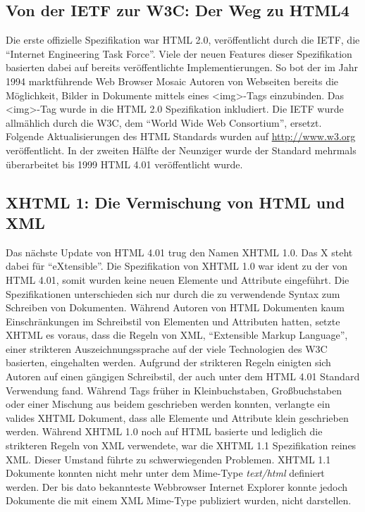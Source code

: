 \subsection{Von der IETF zur W3C: Der Weg zu HTML4}
Die erste offizielle Spezifikation war HTML 2.0, veröffentlicht durch die IETF,
die ``Internet Engineering Task Force''. Viele der neuen Features dieser
Spezifikation basierten dabei auf bereits veröffentlichte Implementierungen.
So bot der im Jahr 1994 marktführende Web Browser Mosaic Autoren von
Webseiten bereits die Möglichkeit, Bilder in Dokumente mittels eines <img>-Tags
einzubinden. Das <img>-Tag wurde in die HTML 2.0 Spezifikation inkludiert.
Die IETF wurde allmählich durch die W3C, dem ``World Wide Web Consortium'',
ersetzt. Folgende Aktualisierungen des HTML Standards wurden auf \url{
http://www.w3.org} veröffentlicht. In der zweiten Hälfte der Neunziger wurde
der Standard mehrmals überarbeitet bis 1999 HTML 4.01 veröffentlicht wurde.

\subsection{XHTML 1: Die Vermischung von HTML und XML}
Das nächste Update von HTML 4.01 trug den Namen XHTML 1.0. Das X steht dabei
für ``eXtensible''. Die Spezifikation von XHTML 1.0 war ident zu der von
HTML 4.01, somit wurden keine neuen Elemente und Attribute eingeführt. Die
Spezifikationen unterschieden sich nur durch die zu verwendende Syntax zum
Schreiben von Dokumenten. Während Autoren von HTML Dokumenten kaum
Einschränkungen im Schreibstil von Elementen und Attributen hatten, setzte
XHTML es voraus, dass die Regeln von XML, ``Extensible Markup Language'',
einer strikteren Auszeichnungssprache auf der viele Technologien des W3C
basierten, eingehalten werden. Aufgrund der strikteren Regeln einigten sich
Autoren auf einen gängigen Schreibstil, der auch unter dem HTML 4.01 Standard
Verwendung fand. Während Tags früher in Kleinbuchstaben, Großbuchstaben oder
einer Mischung aus beidem geschrieben werden konnten, verlangte ein valides
XHTML Dokument, dass alle Elemente und Attribute klein geschrieben werden.
Während XHTML 1.0 noch auf HTML basierte und lediglich die strikteren Regeln
von XML verwendete, war die XHTML 1.1 Spezifikation reines XML. Dieser Umstand
führte zu schwerwiegenden Problemen. XHTML 1.1 Dokumente konnten nicht mehr
unter dem Mime-Type \textit{text/html} definiert werden. Der bis dato
bekannteste Webbrowser Internet Explorer konnte jedoch Dokumente die mit einem
XML Mime-Type publiziert wurden, nicht darstellen.

